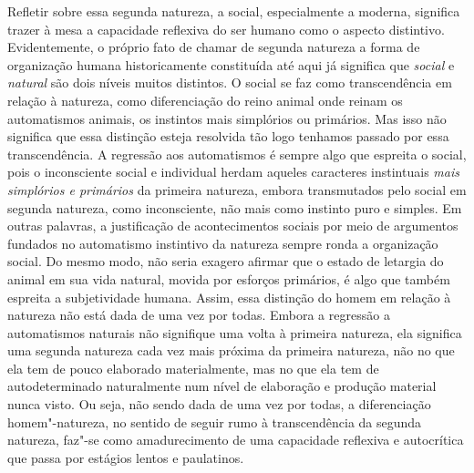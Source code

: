 Refletir sobre essa segunda natureza, a social, especialmente a moderna,
significa trazer à mesa a capacidade reflexiva do ser humano como o
aspecto distintivo. Evidentemente, o próprio fato de chamar de segunda
natureza a forma de organização humana historicamente constituída até
aqui já significa que \emph{social} e \emph{natural} são dois níveis
muitos distintos. O social se faz como transcendência em relação à
natureza, como diferenciação do reino animal onde reinam os automatismos
animais, os instintos mais simplórios ou primários. Mas isso não
significa que essa distinção esteja resolvida tão logo tenhamos passado
por essa transcendência. A regressão aos automatismos é sempre algo que
espreita o social, pois o inconsciente social e individual herdam
aqueles caracteres instintuais \emph{mais simplórios e primários} da
primeira natureza, embora transmutados pelo social em segunda natureza,
como inconsciente, não mais como instinto puro e simples. Em outras
palavras, a justificação de acontecimentos sociais por meio de
argumentos fundados no automatismo instintivo da natureza sempre ronda a
organização social. Do mesmo modo, não seria exagero afirmar que o
estado de letargia do animal em sua vida natural, movida por esforços
primários, é algo que também espreita a subjetividade humana. Assim,
essa distinção do homem em relação à natureza não está dada de uma vez
por todas. Embora a regressão a automatismos naturais não signifique uma
volta à primeira natureza, ela significa uma segunda natureza cada vez
mais próxima da primeira natureza, não no que ela tem de pouco elaborado
materialmente, mas no que ela tem de autodeterminado naturalmente num
nível de elaboração e produção material nunca visto. Ou seja, não sendo
dada de uma vez por todas, a diferenciação homem"-natureza, no sentido de
seguir rumo à transcendência da segunda natureza, faz"-se como
amadurecimento de uma capacidade reflexiva e autocrítica que passa por
estágios lentos e paulatinos.

